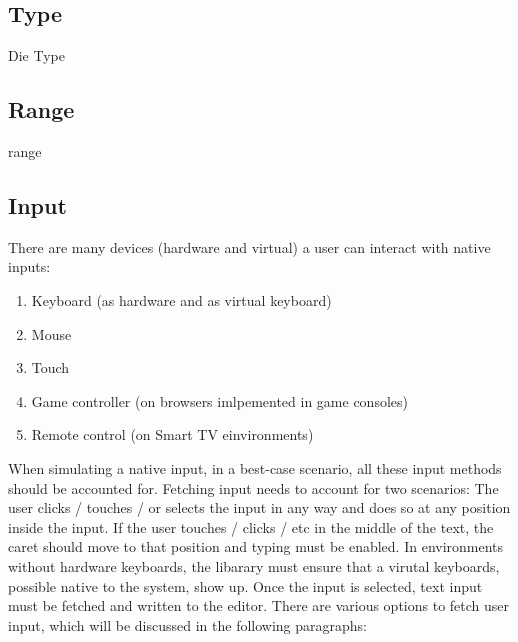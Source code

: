 \subsection{Type}

Die Type

\subsection{Range}
range



\subsection{Input}


There are many devices (hardware and virtual) a user can interact with native inputs:

\begin{enumerate} 
\item Keyboard (as hardware and as virtual keyboard)
\item Mouse
\item Touch
\item Game controller (on browsers imlpemented in game consoles)
\item Remote control (on Smart TV einvironments)
\end{enumerate}

When simulating a native input, in a best-case scenario, all these input methods should be accounted for. Fetching input needs to account for two scenarios: The user clicks / touches / or selects the input in any way and does so at any position inside the input. If the user touches / clicks / etc in the middle of the text, the caret should move to that position and typing must be enabled. In environments without hardware keyboards, the libarary must ensure that a virutal keyboards, possible native to the system, show up. Once the input is selected, text input must be fetched and written to the editor. There are various options to fetch user input, which will be discussed in the following paragraphs:

